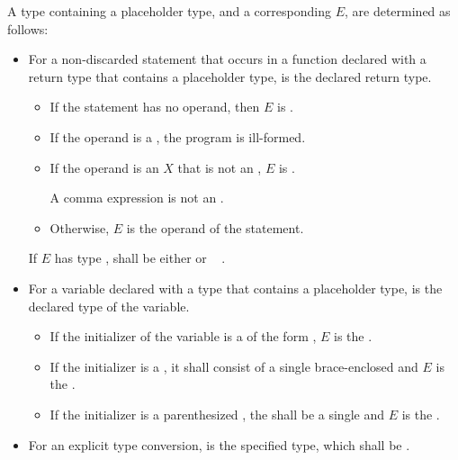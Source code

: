 \pnum
A type  containing a placeholder type,
and a corresponding  $E$,
are determined as follows:
\begin{itemize}
\item
For a non-discarded  statement that occurs
in a function declared with a return type
that contains a placeholder type,
 is the declared return type.
\begin{itemize}
\item
If the  statement has no operand,
then $E$ is .
\item
If the operand is a ,
the program is ill-formed.
\item
If the operand is an  $X$
that is not an ,
$E$ is .
\begin{note}
A comma expression is not
an .
\end{note}
\item
Otherwise, $E$ is the operand of the  statement.
\end{itemize}
If $E$ has type ,
 shall be either
  or
\cv{}~ .
\item
For a variable declared with a type
that contains a placeholder type,
 is the declared type of the variable.
\begin{itemize}
\item
If the initializer of the variable is a 
of the form ,
$E$ is the .
\item
If the initializer is a ,
it shall consist of a single brace-enclosed 
and $E$ is the .
\item
If the initializer is a parenthesized ,
the  shall be
a single 
and $E$ is the .
\end{itemize}
\item
For an explicit type conversion,
 is the specified type, which shall be .
\begin{itemize}

\end{itemize}
\end{itemize}
